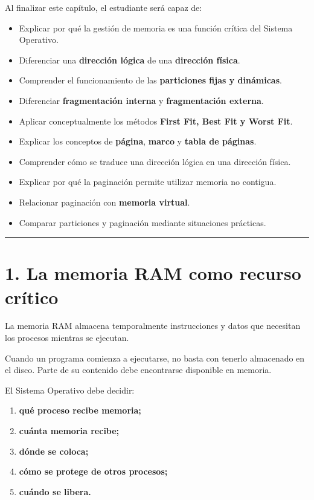 \documentclass[
  spanish,
  letterpaper,
]{scrbook}
\providecommand{\tightlist}{%
  \setlength{\itemsep}{0pt}\setlength{\parskip}{0pt}}
\begin{document}
Al finalizar este capítulo, el estudiante será capaz de:

\begin{itemize}
\tightlist
\item
  Explicar por qué la gestión de memoria es una función crítica del
  Sistema Operativo.
\item
  Diferenciar una \textbf{dirección lógica} de una \textbf{dirección
  física}.
\item
  Comprender el funcionamiento de las \textbf{particiones fijas y
  dinámicas}.
\item
  Diferenciar \textbf{fragmentación interna} y \textbf{fragmentación
  externa}.
\item
  Aplicar conceptualmente los métodos \textbf{First Fit, Best Fit y
  Worst Fit}.
\item
  Explicar los conceptos de \textbf{página}, \textbf{marco} y
  \textbf{tabla de páginas}.
\item
  Comprender cómo se traduce una dirección lógica en una dirección
  física.
\item
  Explicar por qué la paginación permite utilizar memoria no contigua.
\item
  Relacionar paginación con \textbf{memoria virtual}.
\item
  Comparar particiones y paginación mediante situaciones prácticas.
\end{itemize}

\begin{center}\rule{0.5\linewidth}{0.5pt}\end{center}


\chapter{1. La memoria RAM como recurso
crítico}\label{la-memoria-ram-como-recurso-cruxedtico}

La memoria RAM almacena temporalmente instrucciones y datos que
necesitan los procesos mientras se ejecutan.

Cuando un programa comienza a ejecutarse, no basta con tenerlo
almacenado en el disco. Parte de su contenido debe encontrarse
disponible en memoria.

El Sistema Operativo debe decidir:

\begin{enumerate}
\def\labelenumi{\arabic{enumi}.}
\tightlist
\item
  \textbf{qué proceso recibe memoria;}
\item
  \textbf{cuánta memoria recibe;}
\item
  \textbf{dónde se coloca;}
\item
  \textbf{cómo se protege de otros procesos;}
\item
  \textbf{cuándo se libera.}
\end{enumerate}
\end{document}
